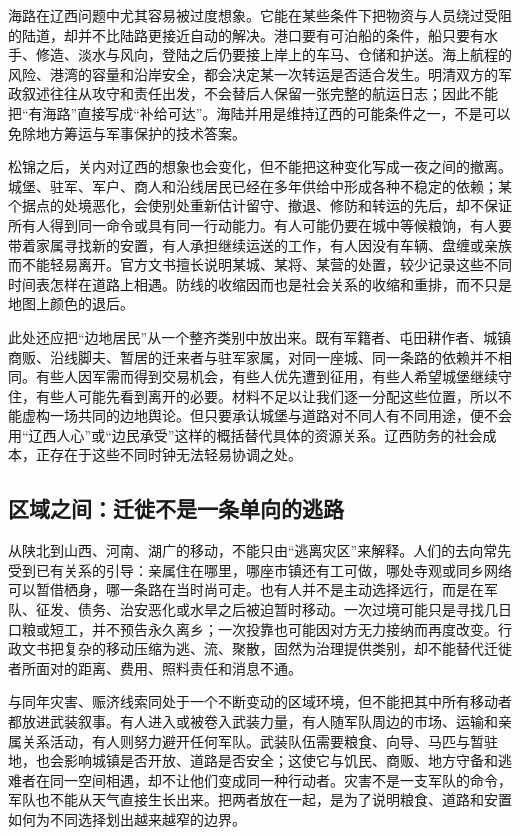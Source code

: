 海路在辽西问题中尤其容易被过度想象。它能在某些条件下把物资与人员绕过受阻的陆道，却并不比陆路更接近自动的解决。港口要有可泊船的条件，船只要有水手、修造、淡水与风向，登陆之后仍要接上岸上的车马、仓储和护送。海上航程的风险、港湾的容量和沿岸安全，都会决定某一次转运是否适合发生。明清双方的军政叙述往往从攻守和责任出发，不会替后人保留一张完整的航运日志；因此不能把“有海路”直接写成“补给可达”。海陆并用是维持辽西的可能条件之一，不是可以免除地方筹运与军事保护的技术答案。

松锦之后，关内对辽西的想象也会变化，但不能把这种变化写成一夜之间的撤离。城堡、驻军、军户、商人和沿线居民已经在多年供给中形成各种不稳定的依赖；某个据点的处境恶化，会使别处重新估计留守、撤退、修防和转运的先后，却不保证所有人得到同一命令或具有同一行动能力。有人可能仍要在城中等候粮饷，有人要带着家属寻找新的安置，有人承担继续运送的工作，有人因没有车辆、盘缠或亲族而不能轻易离开。官方文书擅长说明某城、某将、某营的处置，较少记录这些不同时间表怎样在道路上相遇。防线的收缩因而也是社会关系的收缩和重排，而不只是地图上颜色的退后。

此处还应把“边地居民”从一个整齐类别中放出来。既有军籍者、屯田耕作者、城镇商贩、沿线脚夫、暂居的迁来者与驻军家属，对同一座城、同一条路的依赖并不相同。有些人因军需而得到交易机会，有些人优先遭到征用，有些人希望城堡继续守住，有些人可能先看到离开的必要。材料不足以让我们逐一分配这些位置，所以不能虚构一场共同的边地舆论。但只要承认城堡与道路对不同人有不同用途，便不会用“辽西人心”或“边民承受”这样的概括替代具体的资源关系。辽西防务的社会成本，正存在于这些不同时钟无法轻易协调之处。

\subsection{区域之间：迁徙不是一条单向的逃路}

从陕北到山西、河南、湖广的移动，不能只由“逃离灾区”来解释。人们的去向常先受到已有关系的引导：亲属住在哪里，哪座市镇还有工可做，哪处寺观或同乡网络可以暂借栖身，哪一条路在当时尚可走。也有人并不是主动选择远行，而是在军队、征发、债务、治安恶化或水旱之后被迫暂时移动。一次过境可能只是寻找几日口粮或短工，并不预告永久离乡；一次投靠也可能因对方无力接纳而再度改变。行政文书把复杂的移动压缩为逃、流、聚散，固然为治理提供类别，却不能替代迁徙者所面对的距离、费用、照料责任和消息不通。

与同年灾害、赈济线索同处于一个不断变动的区域环境，但不能把其中所有移动者都放进武装叙事。有人进入或被卷入武装力量，有人随军队周边的市场、运输和亲属关系活动，有人则努力避开任何军队。武装队伍需要粮食、向导、马匹与暂驻地，也会影响城镇是否开放、道路是否安全；这使它与饥民、商贩、地方守备和逃难者在同一空间相遇，却不让他们变成同一种行动者。灾害不是一支军队的命令，军队也不能从天气直接生长出来。把两者放在一起，是为了说明粮食、道路和安置如何为不同选择划出越来越窄的边界。

